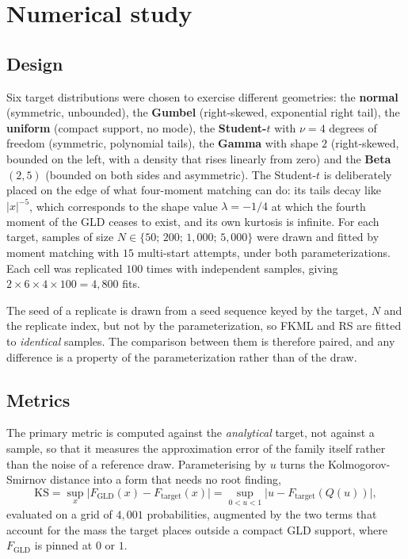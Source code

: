 \section{Numerical study}\label{sec:study}

\subsection{Design}

Six target distributions were chosen to exercise different geometries: the
\textbf{normal} (symmetric, unbounded), the \textbf{Gumbel} (right-skewed,
exponential right tail), the \textbf{uniform} (compact support, no mode), the
\textbf{Student-$t$} with $\nu = 4$ degrees of freedom (symmetric, polynomial
tails), the \textbf{Gamma} with shape $2$ (right-skewed, bounded on the left, with
a density that rises linearly from zero) and the \textbf{Beta}$(2, 5)$ (bounded
on both sides and asymmetric). The Student-$t$ is deliberately placed on the
edge of what four-moment matching can do: its tails decay like $|x|^{-5}$, which
corresponds to the shape value $\lambda = -1/4$ at which the fourth moment of the
GLD ceases to exist, and its own kurtosis is infinite. For each target, samples of
size $N \in \{50;\, 200;\, 1{,}000;\, 5{,}000\}$ were drawn and fitted by moment
matching with $15$ multi-start attempts, under both parameterizations. Each cell
was replicated $100$ times with independent samples, giving
$2 \times 6 \times 4 \times 100 = 4{,}800$ fits.

The seed of a replicate is drawn from a seed sequence keyed by the target, $N$
and the replicate index, but not by the parameterization, so FKML and RS are
fitted to \emph{identical} samples. The comparison between them is therefore
paired, and any difference is a property of the parameterization rather than of
the draw.

\subsection{Metrics}

The primary metric is computed against the \emph{analytical} target, not against
a sample, so that it measures the approximation error of the family itself rather
than the noise of a reference draw. Parameterising by $u$ turns the
Kolmogorov-Smirnov distance into a form that needs no root finding,
\begin{equation}
    \mathrm{KS} = \sup_{x} \bigl| F_{\mathrm{GLD}}(x) - F_{\mathrm{target}}(x) \bigr|
                = \sup_{0<u<1} \bigl| u - F_{\mathrm{target}}(Q(u)) \bigr|,
    \label{eq:ks}
\end{equation}
evaluated on a grid of $4{,}001$ probabilities, augmented by the two terms that
account for the mass the target places outside a compact GLD support, where
$F_{\mathrm{GLD}}$ is pinned at $0$ or $1$.

